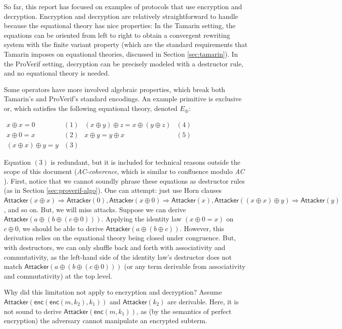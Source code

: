 \documentclass{article}
\theoremstyle{definition}
\begin{document}
So far, this report has focused on examples of protocols that use encryption and decryption. 
Encryption and decryption are relatively straightforward to handle because 
the equational theory has nice properties: 
In the Tamarin setting, the equations can be oriented 
from left to right to obtain a convergent rewriting system with the finite variant property 
(which are the standard requirements that Tamarin imposes on equational theories, discussed in Section \ref{sec:tamarin}). 
In the ProVerif setting, decryption can be precisely modeled with a destructor rule, and no equational theory is needed.

Some operators have more involved algebraic properties, which break both Tamarin's and ProVerif's standard encodings. 
An example primitive is exclusive or, which satisfies the following equational theory, denoted $E_{\oplus}$:

$
\begin{array}{cccc}
   x \oplus x = 0  & (1) & (x \oplus y) \oplus z = x \oplus (y \oplus z) & (4) \\
   x \oplus 0 = x  & (2) &  x \oplus y = y \oplus x & (5)\\ 
   (x \oplus x) \oplus y = y & (3) & &
\end{array}
$

Equation $(3)$ is redundant, but it is included for technical 
reasons outside the scope of this document (\emph{AC-coherence}, which is similar to confluence 
modulo \emph{AC} \cite{folding_variant_narrowing}).
First, notice that we cannot soundly phrase these equations as destructor rules (as in Section \ref{sec:proverif-algo}). 
One can attempt: just use Horn clauses 
$\mathsf{Attacker}(x \oplus x) \Rightarrow \mathsf{Attacker}(0), \mathsf{Attacker}(x \oplus 0) \Rightarrow \mathsf{Attacker}(x), \mathsf{Attacker}((x \oplus x) \oplus y) \Rightarrow \mathsf{Attacker}(y)$, and so on. 
But, we will miss attacks. 
Suppose we can derive $\textsf{Attacker}(a \oplus (b \oplus (c \oplus 0)))$. 
Applying the identity law $(x \oplus 0 = x)$ on $c \oplus 0$, 
we should be able to derive $\textsf{Attacker}(a \oplus (b \oplus c))$. 
However, this derivation relies on the equational theory being closed under congruence. 
But, with destructors, we can only shuffle back and forth with associativity and commutativity,
as the left-hand side of the identity law's destructor does not match $\textsf{Attacker}(a \oplus (b \oplus (c \oplus 0)))$ 
(or any term derivable from associativity and commutativity) at the top level.

Why did this limitation not apply to encryption and decryption? 
Assume $\textsf{Attacker}(\mathsf{enc}(\mathsf{enc}(m, k_2), k_1))$  and $\textsf{Attacker}(k_2)$
are derivable. 
Here, it is not sound to derive $\textsf{Attacker}(\mathsf{enc}(m, k_1))$, 
as (by the semantics of perfect encryption) the adversary cannot manipulate an encrypted subterm.
\end{document}
